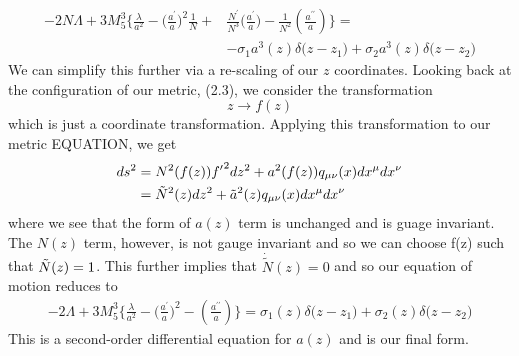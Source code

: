 \documentclass[11pt]{report}
\numberwithin{equation}{chapter}
\begin{document}
\begin{align}
    -2N\Lambda+3M_5^3\bigg\{\frac{\lambda}{a^2}-\bigg(\frac{a^\prime}{a}\bigg)^2\frac{1}{N}+&\frac{N^\prime}{N^3}\bigg(\frac{a^\prime}{a}\bigg)-\frac{1}{N^2}\left(\frac{a^{\prime\prime}}{a}\right)\bigg\}=\\ \nonumber
    &-\sigma_1a^3(z)\delta\big(z-z_1\big)+\sigma_2a^3(z)\delta\big(z-z_2\big)
\end{align}
We can simplify this further via a re-scaling of our $z$ coordinates. Looking back at the configuration of our metric, (2.3), we consider the transformation
\begin{equation}
    z\xrightarrow{}f(z)
\end{equation}
which is just a coordinate transformation. Applying this transformation to our metric EQUATION, we get
\begin{align}
ds^2&=N^{2}(f(z)){f^\prime}^2 dz^{2} + a^{2}(f(z)) q _{\mu\nu}(x) dx^{\mu} dx^{\nu}\\   
&=\Tilde{N}^{2}(z)dz^{2} + \Tilde{a}^{2}(z) q _{\mu\nu}(x) dx^{\mu} dx^{\nu} 
\end{align}
where we see that the form of $a(z)$ term is unchanged and is guage invariant. The $N(z)$ term, however, is not gauge invariant and so we can choose f(z) such that $\Tilde{N}(z)=1$. This further implies that $\Dot{\tilde{N}}(z)=0$ and so our equation of motion reduces to 
\begin{multline}
    -2\Lambda+3M_5^3\bigg\{\frac{\lambda}{a^2}-\bigg(\frac{a^\prime}{a}\bigg)^2-\left(\frac{a^{\prime\prime}}{a}\right)\bigg\}=\sigma_1(z)\delta\big(z-z_1\big)+\sigma_2(z)\delta\big(z-z_2\big)
\end{multline}
This is a second-order differential equation for $a(z)$ and is our final form.\\
\end{document}
